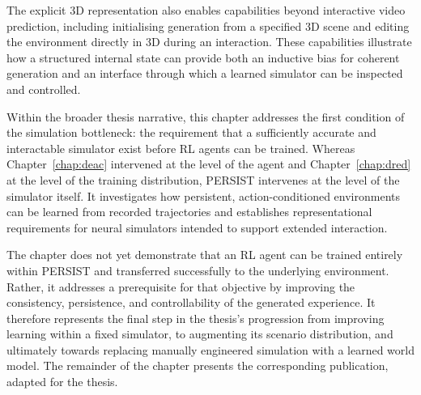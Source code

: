 The explicit 3D representation also enables capabilities beyond interactive video prediction, including initialising generation from a specified 3D scene and editing the environment directly in 3D during an interaction. These capabilities illustrate how a structured internal state can provide both an inductive bias for coherent generation and an interface through which a learned simulator can be inspected and controlled.

Within the broader thesis narrative, this chapter addresses the first condition of the simulation bottleneck: the requirement that a sufficiently accurate and interactable simulator exist before RL agents can be trained. Whereas Chapter~\ref{chap:deac} intervened at the level of the agent and Chapter~\ref{chap:dred} at the level of the training distribution, PERSIST intervenes at the level of the simulator itself. It investigates how persistent, action-conditioned environments can be learned from recorded trajectories and establishes representational requirements for neural simulators intended to support extended interaction.

The chapter does not yet demonstrate that an RL agent can be trained entirely within PERSIST and transferred successfully to the underlying environment. Rather, it addresses a prerequisite for that objective by improving the consistency, persistence, and controllability of the generated experience. It therefore represents the final step in the thesis's progression from improving learning within a fixed simulator, to augmenting its scenario distribution, and ultimately towards replacing manually engineered simulation with a learned world model. The remainder of the chapter presents the corresponding publication, adapted for the thesis.

\clearpage
